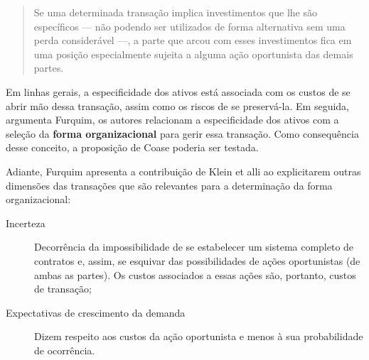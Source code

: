\documentclass[9pt,twocolumn,twoside,lineno]{style}
\begin{document}
\begin{quote}
 Se uma determinada transação implica investimentos que lhe são
 específicos --- não podendo ser utilizados de forma alternativa
 sem uma perda considerável ---, a parte que arcou com esses investimentos fica em uma posição especialmente sujeita a alguma ação
 oportunista das demais partes.
\end{quote}
Em linhas gerais, a especificidade dos ativos está associada com os custos de se abrir mão dessa transação, assim como os riscos de se preservá-la. Em seguida, argumenta Furquim, os autores relacionam a especificidade dos ativos com a seleção da \textbf{forma organizacional} para gerir essa transação. Como consequência desse conceito, a proposição de Coase poderia ser testada.

Adiante, Furquim apresenta a contribuição de Klein et alli ao explicitarem outras dimensões das transações que são relevantes para a determinação da forma organizacional:
\begin{description}
	\item[Incerteza] Decorrência da impossibilidade de se estabelecer um sistema completo de contratos e, assim, se esquivar das possibilidades de ações oportunistas (de ambas as partes). Os custos associados a essas ações são, portanto, custos de transação;
	\item[Expectativas de crescimento da demanda] Dizem respeito aos custos da ação oportunista e menos à sua probabilidade de ocorrência.
\end{description}
\end{document}
